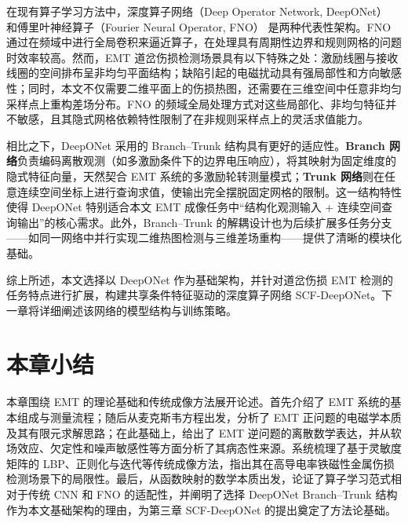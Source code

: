 在现有算子学习方法中，深度算子网络（Deep Operator Network, DeepONet） 和傅里叶神经算子（Fourier Neural Operator, FNO） 是两种代表性架构。FNO 通过在频域中进行全局卷积来逼近算子，在处理具有周期性边界和规则网格的问题时效率较高。然而，EMT 道岔伤损检测场景具有以下特殊之处：激励线圈与接收线圈的空间排布呈非均匀平面结构；缺陷引起的电磁扰动具有强局部性和方向敏感性；同时，本文不仅需要二维平面上的伤损热图，还需要在三维空间中任意非均匀采样点上重构差场分布。FNO 的频域全局处理方式对这些局部化、非均匀特征并不敏感，且其隐式网格依赖特性限制了在非规则采样点上的灵活求值能力。

相比之下，DeepONet 采用的 Branch--Trunk 结构具有更好的适应性。\textbf{Branch 网络}负责编码离散观测（如多激励条件下的边界电压响应），将其映射为固定维度的隐式特征向量，天然契合 EMT 系统的多激励轮转测量模式；\textbf{Trunk 网络}则在任意连续空间坐标上进行查询求值，使输出完全摆脱固定网格的限制。这一结构特性使得 DeepONet 特别适合本文 EMT 成像任务中``结构化观测输入 + 连续空间查询输出''的核心需求。此外，Branch--Trunk 的解耦设计也为后续扩展多任务分支——如同一网络中并行实现二维热图检测与三维差场重构——提供了清晰的模块化基础。

综上所述，本文选择以 DeepONet 作为基础架构，并针对道岔伤损 EMT 检测的任务特点进行扩展，构建共享条件特征驱动的深度算子网络 SCF-DeepONet。下一章将详细阐述该网络的模型结构与训练策略。

\section{本章小结}

本章围绕 EMT 的理论基础和传统成像方法展开论述。首先介绍了 EMT 系统的基本组成与测量流程；随后从麦克斯韦方程出发，分析了 EMT 正问题的电磁学本质及其有限元求解思路；在此基础上，给出了 EMT 逆问题的离散数学表达，并从软场效应、欠定性和噪声敏感性等方面分析了其病态性来源。系统梳理了基于灵敏度矩阵的 LBP、正则化与迭代等传统成像方法，指出其在高导电率铁磁性金属伤损检测场景下的局限性。最后，从函数映射的数学本质出发，论证了算子学习范式相对于传统 CNN 和 FNO 的适配性，并阐明了选择 DeepONet Branch--Trunk 结构作为本文基础架构的理由，为第三章 SCF-DeepONet 的提出奠定了方法论基础。